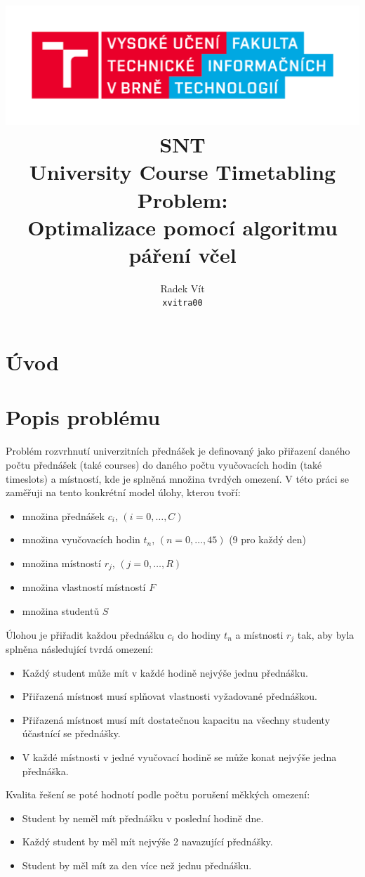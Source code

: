 \documentclass[12pt, a4paper]{article}
\author{Radek Vít\\ \texttt{xvitra00}}
\title{
	\includegraphics[scale=0.6]{FIT_barevne_PANTONE_CZ.pdf}\\
	SNT\\
	University Course Timetabling Problem:\\ Optimalizace pomocí algoritmu páření včel
}
\begin{document}
\newpage
\maketitle

\section{Úvod}
\section{Popis problému}
Problém rozvrhnutí univerzitních přednášek je definovaný jako %
přiřazení daného počtu přednášek (také courses) do daného počtu vyučovacích hodin (také timeslots) a místností,
kde je splněná množina tvrdých omezení. %
V této práci se zaměřuji na tento konkrétní model úlohy, kterou tvoří:
\begin{itemize}
  \item množina přednášek $c_i$, $(i = 0, \dots, C)$
  \item množina vyučovacích hodin $t_n$, $(n = 0, \dots, 45)$ (9 pro každý den)
  \item množina místností $r_j$, $(j = 0, \dots, R)$
  \item množina vlastností místností $F$
  \item množina studentů $S$
\end{itemize}
Úlohou je přiřadit každou přednášku $c_i$ do hodiny $t_n$ a místnosti $r_j$ tak, aby byla splněna následující tvrdá omezení:
\begin{itemize}
  \item Každý student může mít v každé hodině nejvýše jednu přednášku.
  \item Přiřazená místnost musí splňovat vlastnosti vyžadované přednáškou.
  \item Přiřazená místnost musí mít dostatečnou kapacitu na všechny studenty účastnící se přednášky.
  \item V každé místnosti v jedné vyučovací hodině se může konat nejvýše jedna přednáška.
\end{itemize}
Kvalita řešení se poté hodnotí podle počtu porušení měkkých omezení:
\begin{itemize}
  \item Student by neměl mít přednášku v poslední hodině dne.
  \item Každý student by měl mít nejvýše 2 navazující přednášky.
  \item Student by měl mít za den více než jednu přednášku.
\end{itemize}
\end{document}
